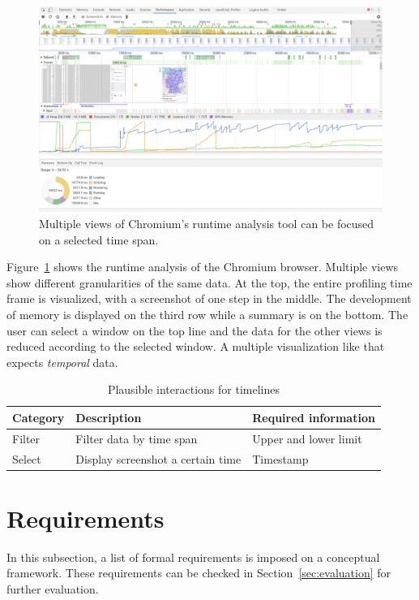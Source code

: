 \begin{figure}
  \centering
  \caption{Multiple views of Chromium's runtime analysis tool can be focused on a selected time span.}
  \label{fig:analysis:timeline}
    \includegraphics[width=\textwidth]{figures/analysis/profiler}
\end{figure}
Figure~\ref{fig:analysis:timeline} shows the runtime analysis of the Chromium browser.
Multiple views show different granularities of the same data.
At the top, the entire profiling time frame is visualized, with a screenshot of one step in the middle.
The development of memory is displayed on the third row while a summary is on the bottom.
The user can select a window on the top line and the data for the other views is reduced according to the selected window.
A multiple visualization like that expects \emph{temporal} data.

\begin{table}[H]
  \caption{Plausible interactions for timelines}%
  \label{fig:analysis:timeline:interactions}
  \begin{tabular*}{\textwidth}{lll}
    \bf Category & \bf Description & \bf Required information \\
    \hline
    Filter & Filter data by time span & Upper and lower limit \\
    Select & Display screenshot a certain time & Timestamp  \\
  \end{tabular*}
\end{table}


\section{Requirements}\label{sec:analysis:requirements}
In this subsection, a list of formal requirements is imposed on a conceptual \cmv{} framework.
These requirements can be checked in Section~\ref{sec:evaluation} for further evaluation.

